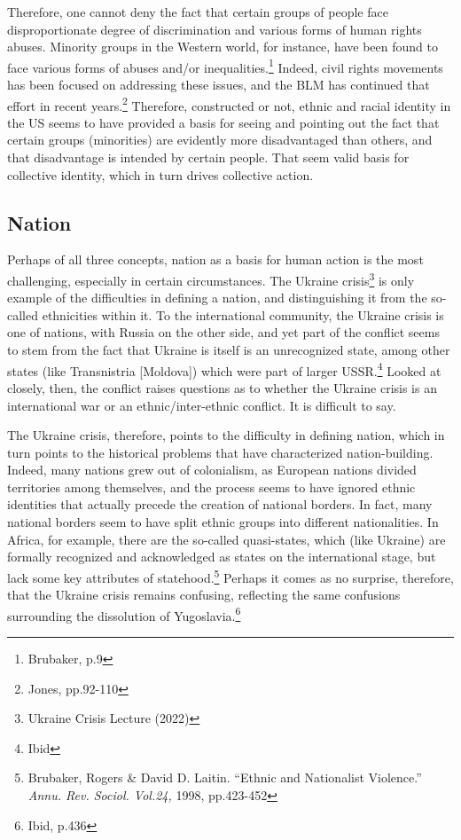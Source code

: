 \documentclass[11pt]{article}
\begin{document}
Therefore, one cannot deny the fact that certain groups of people face disproportionate degree of discrimination and various forms of human rights abuses. Minority groups in the Western world, for instance, have been found to face various forms of abuses and/or inequalities.\footnote{Brubaker, p.9} Indeed, civil rights movements has been focused on addressing these issues, and the BLM has continued that effort in recent years.\footnote{Jones, pp.92-110} Therefore, constructed or not, ethnic and racial identity in the US seems to have provided a basis for seeing and pointing out the fact that certain groups (minorities) are evidently more disadvantaged than others, and that disadvantage is intended by certain people. That seem valid basis for collective identity, which in turn drives collective action.

\subsection{Nation}

Perhaps of all three concepts, nation as a basis for human action is the most challenging, especially in certain circumstances. The Ukraine crisis\footnote{Ukraine Crisis Lecture (2022)} is only example of the difficulties in defining a nation, and distinguishing it from the so-called ethnicities within it. To the international community, the Ukraine crisis is one of nations, with Russia on the other side, and yet part of the conflict seems to stem from the fact that Ukraine is itself is an unrecognized state, among other states (like Transnistria [Moldova]) which were part of larger USSR.\footnote{Ibid} Looked at closely, then, the conflict raises questions as to whether the Ukraine crisis is an international war or an ethnic/inter-ethnic conflict. It is difficult to say.

The Ukraine crisis, therefore, points to the difficulty in defining nation, which in turn points to the historical problems that have characterized nation-building. Indeed, many nations grew out of colonialism, as European nations divided territories among themselves, and the process seems to have ignored ethnic identities that actually precede the creation of national borders. In fact, many national borders seem to have split ethnic groups into different nationalities. In Africa, for example, there are the so-called quasi-states, which (like Ukraine) are formally recognized and acknowledged as states on the international stage, but lack some key attributes of statehood.\footnote{Brubaker, Rogers \& David D. Laitin. “Ethnic and Nationalist Violence.” \textit{Annu. Rev. Sociol. Vol.24,} 1998, pp.423-452} Perhaps it comes as no surprise, therefore, that the Ukraine crisis remains confusing, reflecting the same confusions surrounding the dissolution of Yugoslavia.\footnote{Ibid, p.436}
\end{document}
